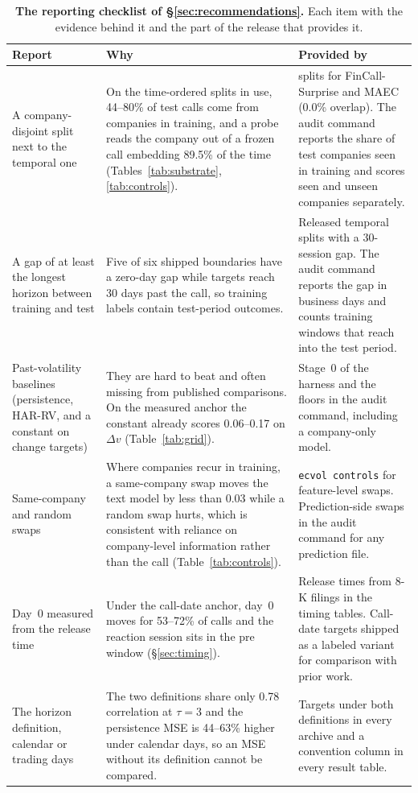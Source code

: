 \begin{table}[t]
\centering
\scriptsize
\setlength{\tabcolsep}{3pt}
\begin{tabular}{p{3.4cm}p{6.2cm}p{5.6cm}}
\toprule
Report & Why & Provided by \\
\midrule
A company-disjoint split next to the temporal one &
On the time-ordered splits in use, 44--80\% of test calls come from companies in
training, and a probe reads the company out of a frozen call embedding 89.5\% of
the time (Tables~\ref{tab:substrate}, \ref{tab:controls}). &
\tickerdisjoint{} splits for FinCall-Surprise and MAEC (0.0\% overlap). The audit
command reports the share of test companies seen in training and scores seen and
unseen companies separately. \\
A gap of at least the longest horizon between training and test &
Five of six shipped boundaries have a zero-day gap while targets reach 30 days past
the call, so training labels contain test-period outcomes. &
Released temporal splits with a 30-session gap. The audit command reports the gap
in business days and counts training windows that reach into the test period. \\
Past-volatility baselines (persistence, HAR-RV, and a constant on change targets) &
They are hard to beat and often missing from published comparisons. On the measured
anchor the constant already scores 0.06--0.17 on $\Delta v$ (Table~\ref{tab:grid}). &
Stage~0 of the harness and the floors in the audit command, including a
company-only model. \\
Same-company and random swaps &
Where companies recur in training, a same-company swap moves the text model by
less than 0.03 while a random swap hurts, which is consistent with reliance on
company-level information rather than the call (Table~\ref{tab:controls}). &
\texttt{ecvol controls} for feature-level swaps. Prediction-side swaps in the
audit command for any prediction file. \\
Day~0 measured from the release time &
Under the call-date anchor, day~0 moves for 53--72\% of calls and the reaction
session sits in the pre window (\S\ref{sec:timing}). &
Release times from 8-K filings in the timing tables. Call-date targets shipped as a
labeled variant for comparison with prior work. \\
The horizon definition, calendar or trading days &
The two definitions share only 0.78 correlation at $\tau{=}3$ and the persistence
MSE is 44--63\% higher under calendar days, so an MSE without its definition cannot
be compared. &
Targets under both definitions in every archive and a convention column in every
result table. \\
\bottomrule
\end{tabular}
\caption{\textbf{The reporting checklist of \S\ref{sec:recommendations}.} Each item
with the evidence behind it and the part of the release that provides it.}
\label{tab:checklist}
\end{table}
